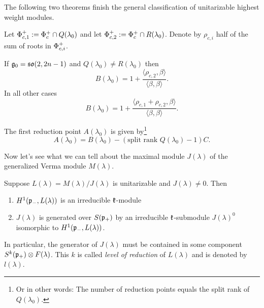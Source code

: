 The following two theorems finish the general classification of unitarizable highest weight modules.

\begin{theorem}
 Let $\Phi^+_{c,1} := \Phi^+_c \cap Q(\lambda_0)$ and let $\Phi^+_{c,2} := \Phi^+_c \cap R(\lambda_0)$. Denote by $\rho_{c,i}$ half of the sum of roots in $\Phi^+_{c,i}$.
 
 If $\mathfrak{g}_0=\mathfrak{so}(2,2n-1)$ and $Q(\lambda_0) \neq R(\lambda_0)$ then \[B(\lambda_0) = 1 + \frac{\langle \rho_{c,2},\beta\rangle}{\langle \beta, \beta \rangle}.\]
 In all other cases \[B(\lambda_0) = 1 + \frac{ \langle \rho_{c,1} + \rho_{c,2} , \beta \rangle}{\langle \beta, \beta \rangle}.\]
\end{theorem}


\begin{theorem}\label{thm:reduction_points}
 The first reduction point $A(\lambda_0)$ is given by\footnote{Or in other words: The number of reduction points equals the split rank of $Q(\lambda_0)$.}
 \[
   A(\lambda_0) = B(\lambda_0) - (\text{split rank } Q(\lambda_0) -1) C.
 \]
\end{theorem}

Now let's see what we can tell about the maximal module $J(\lambda)$ of the generalized Verma module $M(\lambda)$. %

\begin{theorem}
 Suppose $L(\lambda) = M(\lambda)/J(\lambda)$ is unitarizable and $J(\lambda)\neq 0$. Then
 \begin{enumerate}
  \item $H^1(\mathfrak{p}_-,L(\lambda))$ is an irreducible $\mathfrak{k}$-module
  \item $J(\lambda)$ is generated over $S(\mathfrak{p}_+)$ by an irreducible $\mathfrak{k}$-submodule $J(\lambda)^0$ isomorphic to $H^1(\mathfrak{p}_-,L(\lambda))$.
 \end{enumerate}
\end{theorem}


In particular, the generator of $J(\lambda)$ must be contained in some component $S^k(\mathfrak{p}_+)\otimes F(\lambda)$. This $k$ is called \emph{level of reduction} of $L(\lambda)$ and is denoted by $l(\lambda)$.

